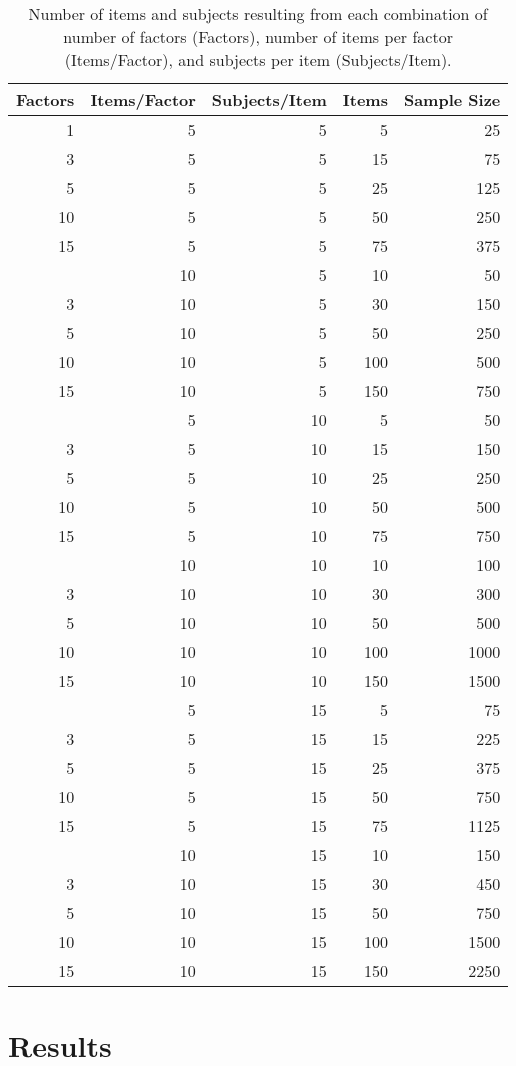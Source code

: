 \documentclass[
  english,
  man]{apa6}
\begin{document}
\begin{longtable}[t]{rrrrr}
\caption{\label{tab:items-subjects-table}Number of items and subjects resulting from each combination of number of factors (Factors), number of items per factor (Items/Factor), and subjects per item (Subjects/Item).}\\
\toprule
Factors & Items/Factor & Subjects/Item & Items & Sample Size\\
\midrule
1 & 5 & 5 & 5 & 25\\
3 & 5 & 5 & 15 & 75\\
5 & 5 & 5 & 25 & 125\\
10 & 5 & 5 & 50 & 250\\
15 & 5 & 5 & 75 & 375\\
\addlinespace
1 & 10 & 5 & 10 & 50\\
3 & 10 & 5 & 30 & 150\\
5 & 10 & 5 & 50 & 250\\
10 & 10 & 5 & 100 & 500\\
15 & 10 & 5 & 150 & 750\\
\addlinespace
1 & 5 & 10 & 5 & 50\\
3 & 5 & 10 & 15 & 150\\
5 & 5 & 10 & 25 & 250\\
10 & 5 & 10 & 50 & 500\\
15 & 5 & 10 & 75 & 750\\
\addlinespace
1 & 10 & 10 & 10 & 100\\
3 & 10 & 10 & 30 & 300\\
5 & 10 & 10 & 50 & 500\\
10 & 10 & 10 & 100 & 1000\\
15 & 10 & 10 & 150 & 1500\\
\addlinespace
1 & 5 & 15 & 5 & 75\\
3 & 5 & 15 & 15 & 225\\
5 & 5 & 15 & 25 & 375\\
10 & 5 & 15 & 50 & 750\\
15 & 5 & 15 & 75 & 1125\\
\addlinespace
1 & 10 & 15 & 10 & 150\\
3 & 10 & 15 & 30 & 450\\
5 & 10 & 15 & 50 & 750\\
10 & 10 & 15 & 100 & 1500\\
15 & 10 & 15 & 150 & 2250\\
\bottomrule
\end{longtable}

\hypertarget{results}{%
\section{Results}\label{results}}
\end{document}
